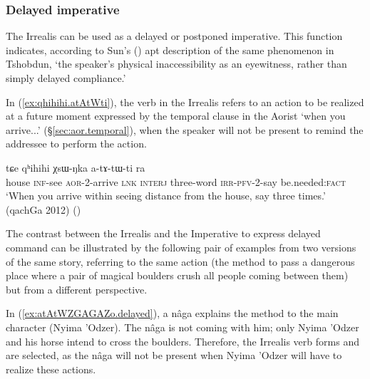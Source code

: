  
\subsubsection{Delayed imperative} \label{sec:irrealis.delayed.imp}
The Irrealis can be used as a delayed or postponed imperative. This function indicates, according to Sun's (\citeyear[809]{jackson07irrealis}) apt description of the same phenomenon in Tshobdun, `the  speaker’s  physical  inaccessibility  as  an  eyewitness,  rather  than  simply  delayed  compliance.'

In (\ref{ex:qhihihi.atAtWti}), the verb in the Irrealis  refers to an action to be realized at a future moment expressed by the temporal clause in the Aorist  `when you arrive...' (§\ref{sec:aor.temporal}), when the speaker will not be present to remind the addressee to perform the action.

\begin{exe}
\ex \label{ex:qhihihi.atAtWti}
 tɕe qʰihihi χsɯ-ŋka a-tɤ-tɯ-ti ra \\
house \textsc{inf}-see \textsc{aor}-2-arrive \textsc{lnk} \textsc{interj} three-word \textsc{irr}-\textsc{pfv}-2-say be.needed:\textsc{fact} \\
\glt `When you arrive within seeing distance from the house, say  three times.' (qachGa 2012) 	()
\end{exe}

The contrast between the Irrealis and the Imperative to express delayed command can be illustrated by the following pair of examples from two versions of the same story, referring to the same action (the method to pass a dangerous place where a pair of magical boulders crush all people coming between them) but from a different perspective. 

In (\ref{ex:atAtWZGAGAZo.delayed}), a nâga explains the method to the main character (Nyima 'Odzer). The nâga is not coming with him; only Nyima 'Odzer and his horse intend to cross the boulders. Therefore, the Irrealis verb forms  and  are selected, as the nâga will not be present when Nyima 'Odzer will have to realize these actions. 

